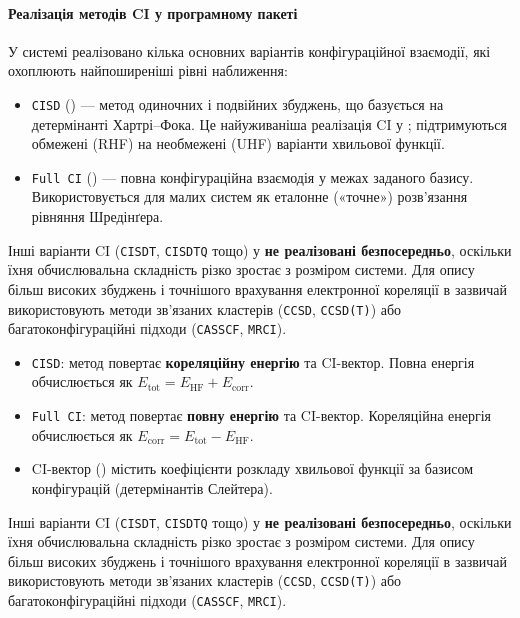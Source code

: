 \paragraph{Реалізація методів CI у програмному пакеті \PySCF}

У системі \PySCF{} реалізовано кілька основних варіантів конфігураційної взаємодії, які охоплюють найпоширеніші рівні наближення:
\begin{itemize}
    \item \texttt{CISD} () --- метод одиночних і подвійних збуджень, що базується на детермінанті Хартрі–Фока. Це найуживаніша реалізація CI у \PySCF; підтримуються обмежені (RHF) на необмежені (UHF)  варіанти хвильової функції.
    \item \texttt{Full CI} () --- повна конфігураційна взаємодія у межах заданого базису. Використовується для малих систем як еталонне («точне») розв'язання рівняння Шредінґера.
\end{itemize}
Інші варіанти CI (\texttt{CISDT}, \texttt{CISDTQ} тощо) у \PySCF{} \textbf{не реалізовані безпосередньо}, оскільки їхня обчислювальна складність різко зростає з розміром системи. Для опису більш високих збуджень і точнішого врахування електронної кореляції в \PySCF{} зазвичай використовують методи зв'язаних кластерів (\texttt{CCSD}, \texttt{CCSD(T)}) або багатоконфігураційні підходи (\texttt{CASSCF}, \texttt{MRCI}).

\begin{commentbox}
\begin{itemize}
    \item \texttt{CISD}: метод  повертає \textbf{кореляційну енергію} та CI-вектор. Повна енергія обчислюється як $E_{\text{tot}} = E_{\text{HF}} + E_{\text{corr}}$.
    \item \texttt{Full CI}: метод  повертає \textbf{повну енергію} та CI-вектор. Кореляційна енергія обчислюється як $E_{\text{corr}} = E_{\text{tot}} - E_{\text{HF}}$.
    \item CI-вектор () містить коефіцієнти розкладу хвильової функції за базисом конфігурацій (детермінантів Слейтера).
\end{itemize}
\end{commentbox}

Інші варіанти CI (\texttt{CISDT}, \texttt{CISDTQ} тощо) у \PySCF{} \textbf{не реалізовані безпосередньо}, оскільки їхня обчислювальна складність різко зростає з розміром системи. Для опису більш високих збуджень і точнішого врахування електронної кореляції в \PySCF{} зазвичай використовують методи зв'язаних кластерів (\texttt{CCSD}, \texttt{CCSD(T)}) або багатоконфігураційні підходи (\texttt{CASSCF}, \texttt{MRCI}).


